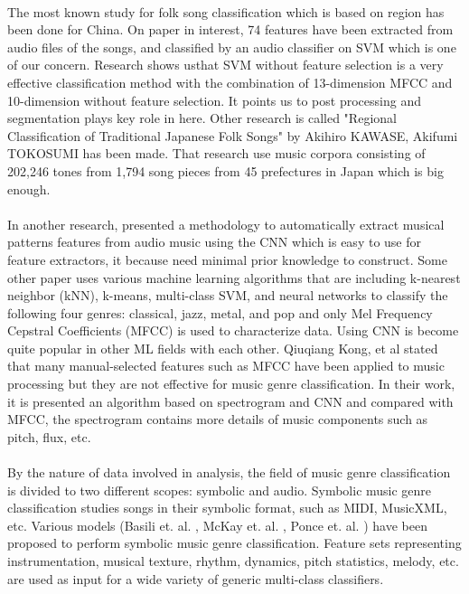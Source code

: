 \documentclass[10pt,twocolumn,letterpaper]{article}
\begin{document}
  \paragraph{}The most known study for folk song classification which is based on region has been done for China. On paper in interest, 74 features have been extracted from audio files of the songs, and classified by an audio classifier on SVM which is one of our concern. Research shows usthat SVM without feature selection is a very effective classification method with the combination of 13-dimension MFCC and 10-dimension without feature selection. It points us to post processing and segmentation plays key role in here. Other research is called "Regional Classification of Traditional Japanese Folk Songs" by Akihiro KAWASE, Akifumi TOKOSUMI has been made. That research use music corpora consisting of 202,246 tones from 1,794 song pieces from 45 prefectures in Japan which is big enough.
  
  \paragraph{}In another research\cite{feature_extraction_automatic_cnn}, presented a methodology to automatically extract musical patterns features from audio music using the CNN which is easy to use for feature extractors, it because need minimal prior knowledge to construct. Some other paper uses\cite{genre_classification} various machine learning algorithms that are including k-nearest neighbor (kNN), k-means, multi-class SVM, and neural networks to classify the following four genres: classical, jazz, metal, and pop and only Mel Frequency Cepstral Coefficients (MFCC) is used to characterize data.
  Using CNN is become quite popular in other ML fields with each other. Qiuqiang Kong, et al\cite{genre_cnn} stated that many manual-selected features such as MFCC have been applied to music processing but they are not effective for music genre classification. In their work, it is presented an algorithm based on spectrogram and CNN and compared with MFCC, the spectrogram contains more details of music components such as pitch, flux, etc. 
  
  \paragraph{}By the nature of data involved in analysis, the field of music genre classification is divided to two different scopes: symbolic and audio. Symbolic music genre classification studies songs in their symbolic format, such as MIDI, MusicXML, etc. Various models (Basili et. al. \cite{to_basili}, McKay et. al. \cite{to_mckay}, Ponce et. al. \cite{to_ponce}) have been proposed to perform symbolic music genre classification. Feature sets representing instrumentation, musical texture, rhythm, dynamics, pitch statistics, melody, etc. are used as input for a wide variety of generic multi-class classifiers.
\end{document}
